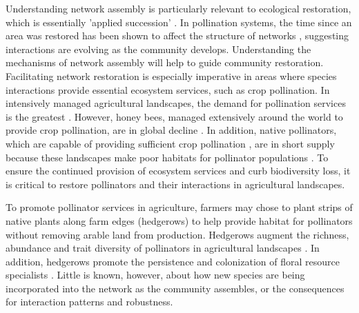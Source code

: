 \documentclass[12pt]{article}
\begin{document}
Understanding network assembly is particularly relevant to ecological
restoration, which is essentially 'applied succession'
\citep[e.g.,][]{parker1997scale}. In pollination systems, the time
since an area was restored has been shown to affect the structure of
networks \citep{forup-2008-742, forup2008restoration,
  devoto2012understanding}, suggesting interactions are evolving as
the community develops. Understanding the mechanisms of network
assembly will help to guide community restoration. Facilitating
network restoration is especially imperative in areas where species
interactions provide essential ecosystem services, such as crop
pollination. In intensively managed agricultural landscapes, the
demand for pollination services is the greatest
\citep{kremen-2008-10}. However, honey bees, managed extensively
around the world to provide crop pollination, are in global decline
\citep{neumann-2010-1, van-engelsdorp-2009-e6481}. In addition, native
pollinators, which are capable of providing sufficient crop
pollination \citep{kremen-2002-16816, winfree-2007-1105,
  kremen-2004-1109}, are in short supply because these landscapes make
poor habitats for pollinator populations \citep{kremen-2002-16816}. To
ensure the continued provision of ecosystem services and curb
biodiversity loss, it is critical to restore pollinators and their
interactions in agricultural landscapes.

To promote pollinator services in agriculture, farmers may chose to
plant strips of native plants along farm edges (hedgerows) to help
provide habitat for pollinators without removing arable land from
production. Hedgerows augment the richness, abundance and trait
diversity of pollinators in agricultural landscapes
\citep{morandin-2013-829, mgonigle-2015-x, kremen-2015-602,
  ponisio2015farm}. In addition, hedgerows promote the persistence and
colonization of floral resource specialists
\citep{mgonigle-2015-x}. Little is known, however, about how new
species are being incorporated into the network as the community
assembles, or the consequences for interaction patterns and
robustness.
\end{document}
